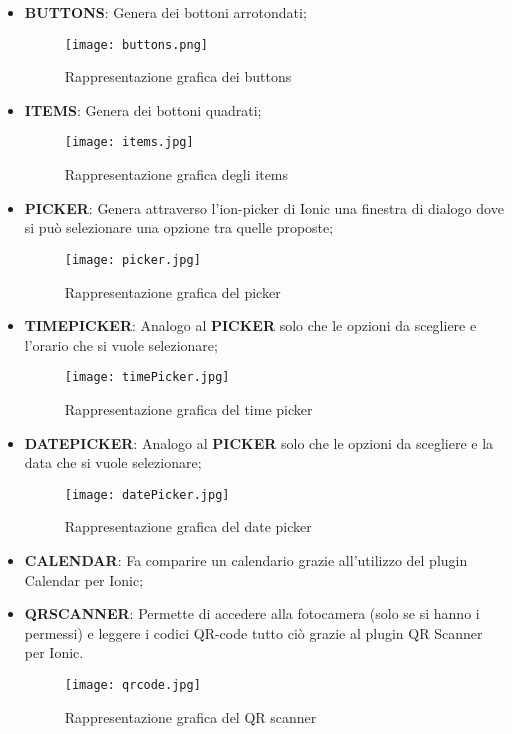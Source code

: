 \begin{itemize}
	\item \textbf{BUTTONS}: Genera dei bottoni arrotondati;
	\begin{figure}[h]
		\centering
		\texttt{[image: buttons.png]}
	\caption{Rappresentazione grafica dei buttons}
	\end{figure}
	\clearpage
	\item \textbf{ITEMS}: Genera dei bottoni quadrati;
	\begin{figure}[h]
		\centering
		\texttt{[image: items.jpg]}
		\caption{Rappresentazione grafica degli items}
	\end{figure}
	\item \textbf{PICKER}: Genera attraverso l'ion-picker di \textsf{Ionic} una finestra di dialogo dove si può selezionare una opzione tra quelle proposte;
	\begin{figure}[h]
		\centering
		\texttt{[image: picker.jpg]}
		\caption{Rappresentazione grafica del picker}
	\end{figure}
	\item \textbf{TIMEPICKER}: Analogo al \textbf{PICKER} solo che le opzioni da scegliere e l'orario che si vuole selezionare;
	\begin{figure}[h]
		\centering
		\texttt{[image: timePicker.jpg]}
		\caption{Rappresentazione grafica del time picker}\label{fig:time}
	\end{figure}
\clearpage
	\item \textbf{DATEPICKER}: Analogo al \textbf{PICKER} solo che le opzioni da scegliere e la data che si vuole selezionare;
	\begin{figure}[h]
		\centering
		\texttt{[image: datePicker.jpg]}
		\caption{Rappresentazione grafica del date picker}\label{fig:date}
	\end{figure}
	\item \textbf{CALENDAR}: Fa comparire un calendario grazie all'utilizzo del plugin Calendar per Ionic;
	\item \textbf{QRSCANNER}: Permette di accedere alla fotocamera (solo se si hanno i permessi) e leggere i codici \textsf{QR-code} tutto ciò grazie al plugin QR Scanner per Ionic.
	\begin{figure}[h]
		\centering
		\texttt{[image: qrcode.jpg]}
		\caption{Rappresentazione grafica del QR scanner}\label{fig:qrc}
	\end{figure}
\end{itemize}

